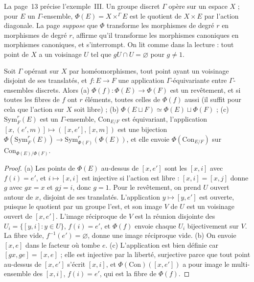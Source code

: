 La page~13 précise l'exemple~III. Un groupe discret $\Gamma$ opère sur un espace $X$ ; pour $E$ un $\Gamma$-ensemble, $\Phi(E) = X \times^\Gamma E$ est le quotient de $X \times E$ par l'action diagonale. La page \emph{suppose} que $\Phi$ transforme les morphismes de degré $r$ en morphismes de degré $r$, affirme qu'il transforme les morphismes canoniques en morphismes canoniques, et s'interrompt. On lit  comme dans la lecture : tout point de $X$ a un voisinage $U$ tel que $gU \cap U = \varnothing$ pour $g \neq 1$.

\begin{encadre}
\begin{theoreme}
Soit $\Gamma$ opérant sur $X$ par homéomorphismes, tout point ayant un voisinage disjoint de ses translatés, et $f : E \to F$ une application $\Gamma$-équivariante entre $\Gamma$-ensembles discrets. Alors \textup{(a)} $\Phi(f) : \Phi(E) \to \Phi(F)$ est un revêtement, et si toutes les fibres de $f$ ont $r$ éléments, toutes celles de $\Phi(f)$ aussi (il suffit pour cela que l'action sur $X$ soit libre) ; \textup{(b)} $\Phi(E \sqcup F) \simeq \Phi(E) \sqcup \Phi(F)$ ; \textup{(c)} $\mathrm{Sym}^r_F(E)$ est un $\Gamma$-ensemble, $\mathrm{Con}_{E/F}$ est équivariant, l'application $[x, (e', m)] \mapsto ([x, e'], [x, m])$ est une bijection $\Phi(\mathrm{Sym}^r_F(E)) \to \mathrm{Sym}^r_{\Phi(F)}(\Phi(E))$, et elle envoie $\Phi(\mathrm{Con}_{E/F})$ sur $\mathrm{Con}_{\Phi(E)/\Phi(F)}$.
\end{theoreme}
\end{encadre}

\begin{proof}
(a) Les points de $\Phi(E)$ au-dessus de $[x, e']$ sont les $[x, i]$ avec $f(i) = e'$, et $i \mapsto [x, i]$ est injective si l'action est libre : $[x, i] = [x, j]$ donne $g$ avec $gx = x$ et $gj = i$, donc $g = 1$. Pour le revêtement, on prend $U$ ouvert autour de $x$, disjoint de ses translatés. L'application $y \mapsto [y, e']$ est ouverte, puisque le quotient par un groupe l'est, et son image $V$ de $U$ est un voisinage ouvert de $[x, e']$. L'image réciproque de $V$ est la réunion disjointe des $U_i = \{[y, i] : y \in U\}$, $f(i) = e'$, et $\Phi(f)$ envoie chaque $U_i$ bijectivement sur $V$. La fibre vide, $f^{-1}(e') = \varnothing$, donne une image réciproque vide. (b) On envoie $[x, e]$ dans le facteur où tombe $e$. (c) L'application est bien définie car $[gx, ge] = [x, e]$ ; elle est injective par la liberté, surjective parce que tout point au-dessus de $[x, e']$ s'écrit $[x, i]$, et $\Phi(\mathrm{Con})([x, e'])$ a pour image le multi-ensemble des $[x, i]$, $f(i) = e'$, qui est la fibre de $\Phi(f)$.
\end{proof}

